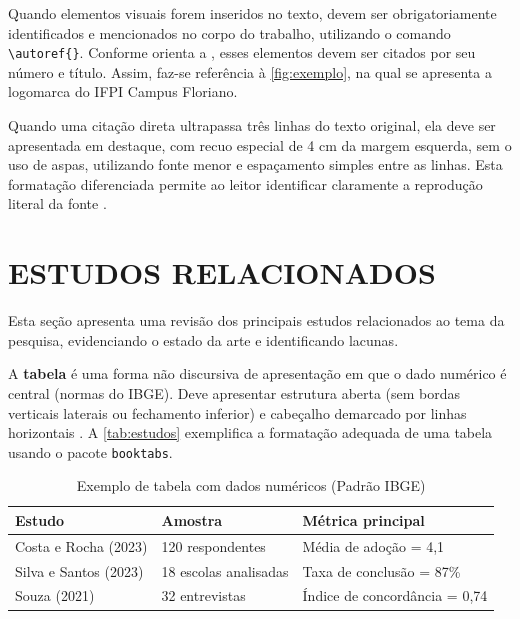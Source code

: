 Quando elementos visuais forem inseridos no texto, devem ser obrigatoriamente identificados e mencionados no corpo do trabalho, utilizando o comando \verb|\autoref{}|. Conforme orienta a , esses elementos devem ser citados por seu número e título. Assim, faz-se referência à \autoref{fig:exemplo}, na qual se apresenta a logomarca do IFPI Campus Floriano.


\begin{citacao}
Quando uma citação direta ultrapassa três linhas do texto original, ela deve ser apresentada em destaque, com recuo especial de 4 cm da margem esquerda, sem o uso de aspas, utilizando fonte menor e espaçamento simples entre as linhas. Esta formatação diferenciada permite ao leitor identificar claramente a reprodução literal da fonte \cite{ABNT_NBR10520_2023}.
\end{citacao}

\section{ESTUDOS RELACIONADOS}
\label{sec:estudos-relacionados} 

Esta seção apresenta uma revisão dos principais estudos relacionados ao tema da pesquisa, evidenciando o estado da arte e identificando lacunas.

A \textbf{tabela} é uma forma não discursiva de apresentação em que o dado numérico é central (normas do IBGE). Deve apresentar estrutura aberta (sem bordas verticais laterais ou fechamento inferior) e cabeçalho demarcado por linhas horizontais \cite{ABNT_NBR14724_2011,ABNT_NBR15287_2011}. A \autoref{tab:estudos} exemplifica a formatação adequada de uma tabela usando o pacote \texttt{booktabs}.

\begin{table}[htbp]
    \centering
    \caption{Exemplo de tabela com dados numéricos (Padrão IBGE)}
    \label{tab:estudos}
    \begin{tabularx}{0.8\textwidth}{p{4cm}XX}
        \toprule
        \textbf{Estudo} & \textbf{Amostra} & \textbf{Métrica principal} \\
        \midrule
        Costa e Rocha (2023) & 120 respondentes & Média de adoção = 4,1 \\
        Silva e Santos (2023) & 18 escolas analisadas & Taxa de conclusão = 87\% \\
        Souza (2021) & 32 entrevistas & Índice de concordância = 0,74 \\
        \bottomrule
    \end{tabularx}
\end{table}

